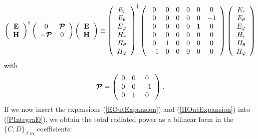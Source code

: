 \documentclass[letterpaper]{article}
\begin{document}
$$
   \left(\begin{array}{c} \mathbf{E} \\ \mathbf{H} \end{array}\right)^\dagger
   \left(\begin{array}{cc} 0 & \boldsymbol{\mathcal{P}} \\ 
                           -\boldsymbol{\mathcal{P}} & 0 \\
         \end{array}\right)
   \left(\begin{array}{c} \mathbf{E} \\ \mathbf{H} \end{array}\right)
   \equiv
   \left(\begin{array}{c} 
   E_r \\ E_\theta \\ E_{\varphi} \\ 
   H_r \\ H_\theta \\ H_{\varphi}
   \end{array} \right)^{\dagger}
   \left(\begin{array}{cccccc}
   0 & 0 & 0 & 0 & 0 & 0   \\
   0 & 0 & 0 & 0 & 0 & -1  \\
   0 & 0 & 0 & 0 & 1 & 0   \\
   0 & 0 & 0 & 0 & 0 & 0   \\
   0 & 1 & 0 & 0 & 0 & 0   \\
  -1 & 0 & 0 & 0 & 0 & 0   \\
   \end{array} \right)
   \left(\begin{array}{c} 
   E_r \\ E_\theta \\ E_{\varphi} \\ 
   H_r \\ H_\theta \\ H_{\varphi}
   \end{array} \right)
$$
with
$$\boldsymbol{\mathcal{P}}=\left(\begin{array}{ccc} 
   0 & 0 & 0 \\ 0 & 0 & -1 \\ 0 & 1 & 0 
   \end{array}\right).
$$
If we now insert the expansions (\ref{EOutExpansion}) and
(\ref{HOutExpansion}) into (\ref{PIntegral0}), we obtain
the total radiated power as a bilinear form in the 
$\{C,D\}_{\ell m}$ coefficients:

\end{document}
